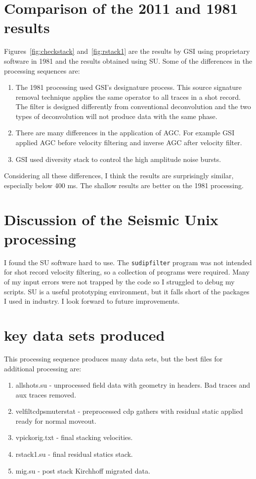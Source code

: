 
\section{Comparison of the 2011 and 1981 results}
Figures~\ref{fig:checkstack} and~\ref{fig:rstack1} are the results by GSI 
using proprietary software in 1981 and the results obtained using SU.  
Some of the differences in the processing sequences are:
\begin{enumerate}
\item The 1981 processing used GSI's designature process.  This source 
signature removal technique applies the same operator to all traces in a 
shot record.  The filter is designed differently from conventional 
deconvolution and the two types of deconvolution will not produce data 
with the same phase. 
\item There are many differences in the application of AGC.  For example 
GSI applied AGC before velocity filtering and inverse AGC after velocity 
filter.
\item GSI used diversity stack to control the high amplitude noise bursts.
\end{enumerate}
Considering all these differences, I think the results are surprisingly 
similar, especially below 400 ms.  The shallow results are better on the 
1981 processing.

\section{Discussion of the Seismic Unix processing}
I found the SU software hard to use.  The \texttt{sudipfilter} program
was not intended for shot record velocity filtering, so a collection of
programs were required.  Many of my input errors were not trapped by
the code so I struggled to debug my scripts.  SU is a useful
prototyping environment, but it falls short of the packages I used in 
industry.  I look forward to future improvements.

\section{key data sets produced}
This processing sequence produces many data sets, but the best files for 
additional processing are:
\begin{enumerate}
\item allshots.su - unprocessed field data with geometry in headers.  Bad 
traces and aux traces removed.
\item velfiltcdpsmuterstat - preprocessed cdp gathers with residual static 
applied ready for normal moveout.
\item vpickorig.txt - final stacking velocities.
\item rstack1.su - final residual statics stack.
\item mig.su - post stack Kirchhoff migrated data.
\end{enumerate}

